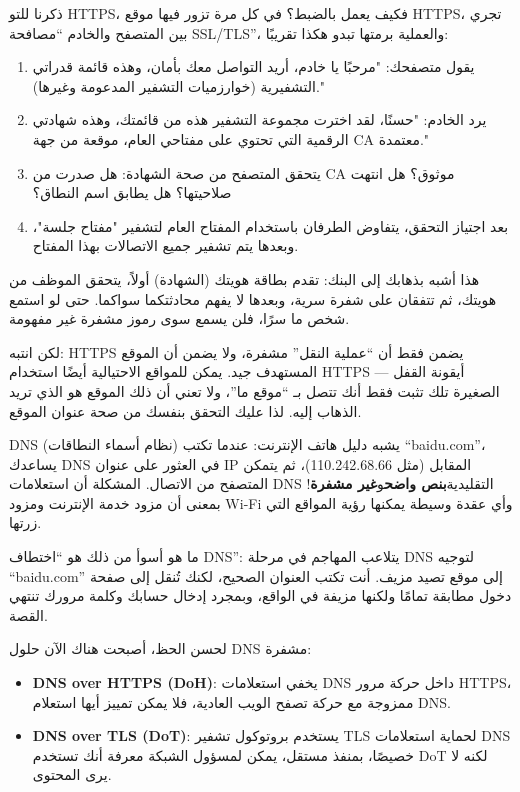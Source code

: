 
ذكرنا للتو HTTPS، فكيف يعمل بالضبط؟ في كل مرة تزور فيها موقع HTTPS، تجري بين المتصفح والخادم “مصافحة SSL/TLS”، والعملية برمتها تبدو هكذا تقريبًا:

\begin{enumerate}
  \item يقول متصفحك: "مرحبًا يا خادم، أريد التواصل معك بأمان، وهذه قائمة قدراتي التشفيرية (خوارزميات التشفير المدعومة وغيرها)."
  \item يرد الخادم: "حسنًا، لقد اخترت مجموعة التشفير هذه من قائمتك، وهذه شهادتي الرقمية التي تحتوي على مفتاحي العام، موقعة من جهة CA معتمدة."
  \item يتحقق المتصفح من صحة الشهادة: هل صدرت من CA موثوق؟ هل انتهت صلاحيتها؟ هل يطابق اسم النطاق؟
  \item بعد اجتياز التحقق، يتفاوض الطرفان باستخدام المفتاح العام لتشفير "مفتاح جلسة"، وبعدها يتم تشفير جميع الاتصالات بهذا المفتاح.
\end{enumerate}

هذا أشبه بذهابك إلى البنك: تقدم بطاقة هويتك (الشهادة) أولاً، يتحقق الموظف من هويتك، ثم تتفقان على شفرة سرية، وبعدها لا يفهم محادثتكما سواكما. حتى لو استمع شخص ما سرًا، فلن يسمع سوى رموز مشفرة غير مفهومة.

لكن انتبه: HTTPS يضمن فقط أن “عملية النقل” مشفرة، ولا يضمن أن الموقع المستهدف جيد. يمكن للمواقع الاحتيالية أيضًا استخدام HTTPS — أيقونة القفل الصغيرة تلك تثبت فقط أنك تتصل بـ “موقع ما”، ولا تعني أن ذلك الموقع هو الذي تريد الذهاب إليه. لذا عليك التحقق بنفسك من صحة عنوان الموقع.


DNS (نظام أسماء النطاقات) يشبه دليل هاتف الإنترنت: عندما تكتب “baidu.com”، يساعدك DNS في العثور على عنوان IP المقابل (مثل 110.242.68.66)، ثم يتمكن المتصفح من الاتصال. المشكلة أن استعلامات DNS التقليدية\textbf{بنص واضح}و\textbf{غير مشفرة}! بمعنى أن مزود خدمة الإنترنت ومزود Wi-Fi وأي عقدة وسيطة يمكنها رؤية المواقع التي زرتها.

ما هو أسوأ من ذلك هو “اختطاف DNS”: يتلاعب المهاجم في مرحلة DNS لتوجيه “baidu.com” إلى موقع تصيد مزيف. أنت تكتب العنوان الصحيح، لكنك تُنقل إلى صفحة دخول مطابقة تمامًا ولكنها مزيفة في الواقع، وبمجرد إدخال حسابك وكلمة مرورك تنتهي القصة.

لحسن الحظ، أصبحت هناك الآن حلول DNS مشفرة:

\begin{itemize}
  \item \textbf{DNS over HTTPS (DoH)}: يخفي استعلامات DNS داخل حركة مرور HTTPS، ممزوجة مع حركة تصفح الويب العادية، فلا يمكن تمييز أيها استعلام DNS.
  \item \textbf{DNS over TLS (DoT)}: يستخدم بروتوكول تشفير TLS لحماية استعلامات DNS خصيصًا، بمنفذ مستقل، يمكن لمسؤول الشبكة معرفة أنك تستخدم DoT لكنه لا يرى المحتوى.
\end{itemize}


